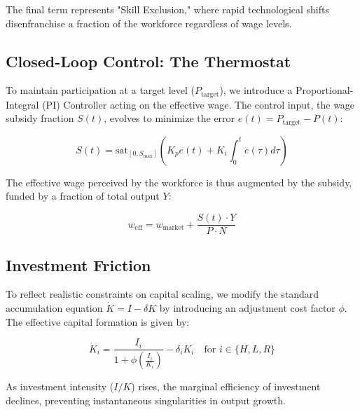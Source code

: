 The final term represents "Skill Exclusion," where rapid technological shifts disenfranchise a fraction of the workforce regardless of wage levels.

\subsection{Closed-Loop Control: The Thermostat}
To maintain participation at a target level ($P_{\text{target}}$), we introduce a Proportional-Integral (PI) Controller acting on the effective wage. The control input, the wage subsidy fraction $S(t)$, evolves to minimize the error $e(t) = P_{\text{target}} - P(t)$:

$$
S(t) = \text{sat}_{[0, S_{\text{max}}]} \left( K_p e(t) + K_i \int_{0}^{t} e(\tau) d\tau \right)
$$

The effective wage perceived by the workforce is thus augmented by the subsidy, funded by a fraction of total output $Y$:

$$
w_{\text{eff}} = w_{\text{market}} + \frac{S(t) \cdot Y}{P \cdot N}
$$

\subsection{Investment Friction}
To reflect realistic constraints on capital scaling, we modify the standard accumulation equation $\dot{K} = I - \delta K$ by introducing an adjustment cost factor $\phi$. The effective capital formation is given by:

$$
\dot{K}_i = \frac{I_i}{1 + \phi \left( \frac{I_i}{K_i} \right)} - \delta_i K_i \quad \text{for } i \in \{H, L, R\}
$$

As investment intensity ($I/K$) rises, the marginal efficiency of investment declines, preventing instantaneous singularities in output growth.
